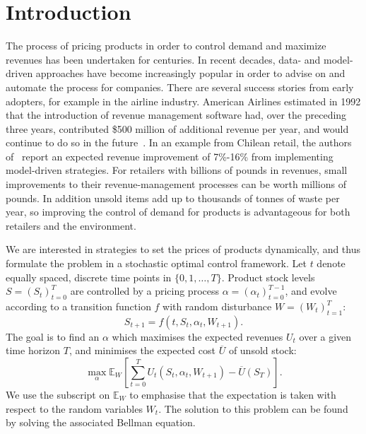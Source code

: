 \documentclass{rsproca_new}
\theoremstyle{definition}
\begin{document}
\section{Introduction}
The process of pricing products in order to control demand and
maximize revenues has been undertaken for centuries. In recent
decades, data- and model-driven approaches have become increasingly
popular in order to advise on and automate the process for companies.
There are several success stories from early adopters, for example in
the airline industry.
American Airlines estimated in 1992 that the introduction of revenue
management software had, over the preceding three
years, contributed \$500 million of additional revenue per year,
and would continue to do so in the future~\cite{smith1992yield}.
In an example from Chilean retail, the authors of~\cite{bitran1998coordinating}
report an expected revenue improvement of 7\%-16\% from implementing
model-driven strategies.
For retailers with billions of pounds in revenues, small
improvements to their revenue-management processes can be worth millions
of pounds.
In addition unsold items add up to thousands of tonnes of waste per year, so
improving the control of demand for products is advantageous
for both retailers and the environment.

We are interested in strategies to  set the prices of
products dynamically, and thus
formulate the problem in a stochastic optimal control framework.
Let $t$ denote equally spaced, discrete time points in $\{0,1,\dots,T\}$.
Product stock levels $S={(S_t)}_{t=0}^T$ are controlled by a pricing process
$\alpha={(\alpha_t)}_{t=0}^{T-1}$, and evolve according to a transition function $f$ with random disturbance
$W={(W_t)}_{t=1}^T$:
\begin{equation}
  S_{t+1}=f(t,S_t,\alpha_t,W_{t+1}).
\end{equation}
The goal is to find an $\alpha$ which maximises the expected revenues $U_t$ over a
given time horizon $T$, and
minimises the expected cost $\overline{U}$ of unsold stock:
\begin{equation}
  \max_{\alpha}\mathbb E_W\left[ \sum_{t=0}^TU_t(S_t,\alpha_t,W_{t+1})
    - \overline{U}(S_T)\right].
\end{equation}
We use the subscript on $\mathbb E_W$ to emphasise that the
expectation is taken with respect to the random variables $W_t$.
The solution to this problem can be found by solving the associated
Bellman equation.
\end{document}
